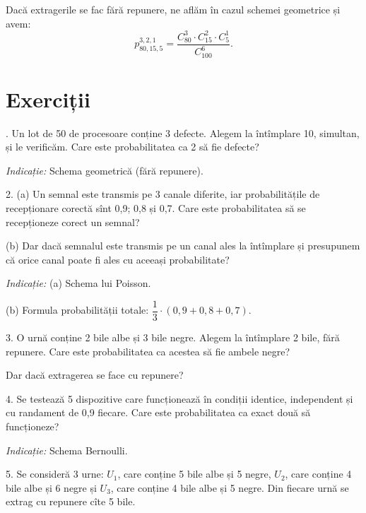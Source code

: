Dacă extragerile se fac fără repunere, ne aflăm în cazul schemei geometrice și avem:
\[
  p_{80, 15, 5}^{3, 2, 1} = \frac{C_{80}^3 \cdot C_{15}^2 \cdot C_5^1}{C_{100}^6}.
\]



\section{Exerciții}

\indent{}. Un lot de 50 de procesoare conține 3 defecte. Alegem la întîmplare
10, simultan, și le verificăm. Care este probabilitatea ca 2 să fie defecte?

\emph{Indicație:} Schema geometrică (fără repunere).

\vspace{0.3cm}

2. (a) Un semnal este transmis pe 3 canale diferite, iar probabilitățile de
recepționare corectă sînt 0,9; 0,8 și 0,7. Care este probabilitatea să se
recepționeze corect un semnal?

(b) Dar dacă semnalul este transmis pe un canal ales la întîmplare și presupunem
că orice canal poate fi ales cu aceeași probabilitate?

\emph{Indicație:} (a) Schema lui Poisson.

(b) Formula probabilității totale: $ \dfrac{1}{3} \cdot (0,9 + 0,8 + 0,7) $.

\vspace{0.3cm}

3. O urnă conține 2 bile albe și 3 bile negre. Alegem la întîmplare 2 bile,
fără repunere. Care este probabilitatea ca acestea să fie ambele negre?

Dar dacă extragerea se face cu repunere?

\vspace{0.3cm}

4. Se testează 5 dispozitive care funcționează în condiții identice, independent
și cu randament de 0,9 fiecare. Care este probabilitatea ca exact două să
funcționeze?

\emph{Indicație:} Schema Bernoulli.

\vspace{0.3cm}

5. Se consideră 3 urne: $ U_1 $, care conține 5 bile albe și 5 negre, $ U_2 $,
care conține 4 bile albe și 6 negre și $ U_3 $, care conține 4 bile albe
și 5 negre. Din fiecare urnă se extrag cu repunere cîte 5 bile.

